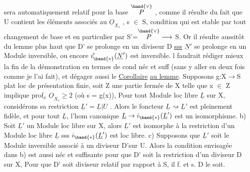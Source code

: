 
sera automatiquement  relatif pour la base $\overset{\hand{\vee}}{P}$ , comme il
résulte du fait que U contient les éléments associés au $\underline{O}_{X_s}$ , s $\in$ S,
condition qui est stable par tout changement de base et en particulier
par S'=$\overset{\hand{\vee}}{P} \longrightarrow$ S. Or il résulte aussitôt du lemme  plus haut que D' se
prolonge en un diviseur  D \uline{sss} $\underline{N}'$ se prolonge en un Module
inversible, ou encore $i'_{\hand{*}}(\underline{N}')$ est inversible.  l faudrait rédiger
mieux la fin de la démonstration en termes de cond néc et suff (sans y
aller en deux fois comme je l'ai fait), et dégager aussi  le
\uline{Corollaire}  \uline{au lemme}. Supposons g:X$\to$S plat loc de présentation finie,
soit Z une partie fermée de X telle que x $\in$ Z implique prof$_x$ $\underline{O}_{X_s} \geq 2$
\inserted[soit U=X-Z et i:U$\to$X l'immersion c an.]
(où s = g(x)), 
 Pour tout Module loc libre \inserted[de t.f] $\underline{L}$ sur X,
considérons sa restriction $\underline{L}' = \underline{L}|U$ . Alors \inserted[a)] le foncteur $\underline{L} \rightsquigarrow \underline{L}'$ est
pleinement fidèle, et pour  tout $\underline{L}$, 
l'hom canonique $\underline{L} \to i_{\hand{*}}(\underline{L}')$ est un isomorphisme.  \hand{(} b) Soit $\underline{L}'$ un
Module loc libre sur X, alors $\underline{L}'$ est isomorphe à la restriction d'un
Module loc libre $\underline{L}$ sss $i_{\hand{*}}(\underline{L}')$ est loc libre. c) Supposons que $\underline{L}'$ soit
le Module inversible associé à un diviseur  D'\hand{/}sur U. Alors
la condition envisagée dans b) est aussi néc et suffisante pour que D'
soit la restriction d'un diviseur  D sur X,  \hand{|} Pour que D' soit
diviseur  relatif par rapport à S, il f. et s.  D le soit.

